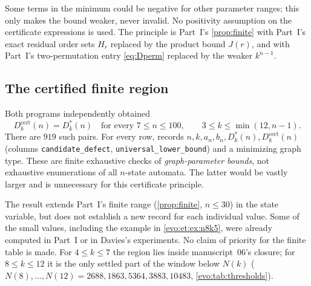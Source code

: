 \documentclass[11pt,a4paper]{article}
\numberwithin{equation}{section}
\theoremstyle{definition}
\theoremstyle{remark}
\begin{document}
Some terms in the minimum could be negative for other parameter ranges; this
only makes the bound weaker, never invalid. No positivity assumption on the
certificate expressions is used. The principle is Part~I's
\cref{prop:finite} with Part~I's exact residual order sets $H_r$ replaced by
the product bound $J(r)$, and with Part~I's two-permutation entry
\eqref{eq:Dperm} replaced by the weaker $k^{n-1}$.

\subsection{The certified finite region}

Both programs independently obtained
\begin{equation}\label{evo:et:eq:region}
 D^{\mathrm{cert}}_k(n)=D^*_k(n)
 \quad\text{for every }7\le n\le100,
 \qquad3\le k\le\min(12,n-1).
\end{equation}
There are $919$ such pairs. For every row,
 records
$n,k,a_n,b_n,D^*_k(n),D^{\mathrm{cert}}_k(n)$ (columns
\texttt{candidate\_defect}, \texttt{universal\_lower\_bound}) and a minimizing
graph type. These are finite exhaustive checks of \emph{graph-parameter
bounds}, not exhaustive enumerations of all $n$-state automata. The latter
would be vastly larger and is unnecessary for this certificate principle.

The result extends Part~I's finite range (\cref{prop:finite}, $n\le30$) in the
state variable, but does not establish a new record for each individual value.
Some of the small values, including the example in \cref{evo:et:ex:n8k5},
were already computed in Part~I or in Davies's experiments. No claim of
priority for the finite table is made. For $4\le k\le7$ the region lies inside
manuscript~06's closure; for $8\le k\le12$ it is the only settled part of the
window below $N(k)$ ($N(8),\ldots,N(12)=2688,1863,5364,3883,10483$,
\cref{evo:tab:thresholds}).
\end{document}
